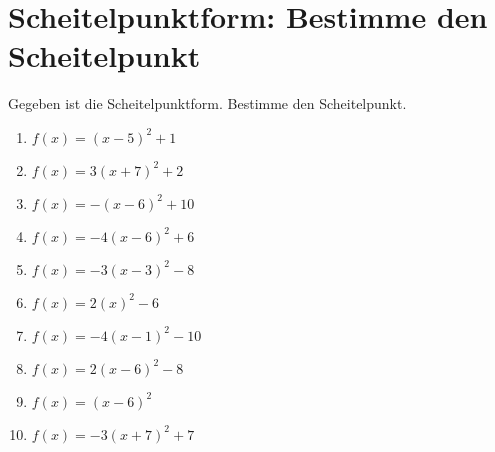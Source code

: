 \documentclass{article}%
\begin{document}
\section{Scheitelpunktform: Bestimme den Scheitelpunkt}%
\label{sec:ScheitelpunktformBestimmedenScheitelpunkt}%
Gegeben ist die Scheitelpunktform. Bestimme den Scheitelpunkt.%
\begin{enumerate}[label=\alph*)]%
\item%
\newline\vspace{0.5cm} $f(x)=(x-5)^2 +1$%
\item%
\newline\vspace{0.5cm} $f(x)=3(x+7)^2 +2$%
\item%
\newline\vspace{0.5cm} $f(x)=-(x-6)^2 +10$%
\item%
\newline\vspace{0.5cm} $f(x)=-4(x-6)^2 +6$%
\item%
\newline\vspace{0.5cm} $f(x)=-3(x-3)^2 -8$%
\item%
\newline\vspace{0.5cm} $f(x)=2(x)^2 -6$%
\item%
\newline\vspace{0.5cm} $f(x)=-4(x-1)^2 -10$%
\item%
\newline\vspace{0.5cm} $f(x)=2(x-6)^2 -8$%
\item%
\newline\vspace{0.5cm} $f(x)=(x-6)^2$%
\item%
\newline\vspace{0.5cm} $f(x)=-3(x+7)^2 +7$%
\end{enumerate}

%
\end{document}
